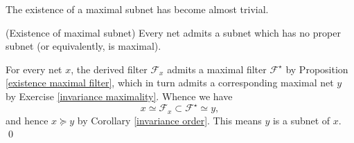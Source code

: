 \documentclass{report}
\begin{document}
The existence of a maximal subnet has become almost trivial.
\begin{cor} (Existence of maximal subnet)
    Every net admits a subnet which has no proper subnet (or equivalently, is maximal).
\end{cor}
\begin{prf}
    For every net \( x \), the derived filter \( \mathscr{F}_x \) admits a maximal filter \( \mathscr{F}^{\star} \) by Proposition \ref{existence maximal filter}, which in turn admits a corresponding maximal net \( y \) by Exercise \ref{invariance maximality}. Whence we have
    \[
        x \simeq \mathscr{F}_x \subset \mathscr{F}^{\star} \simeq y,
    \]
    and hence \( x \succeq y \) by Corollary \ref{invariance order}. This means \( y \) is a subnet of \( x \).
    \qed\end{prf}
\end{document}
